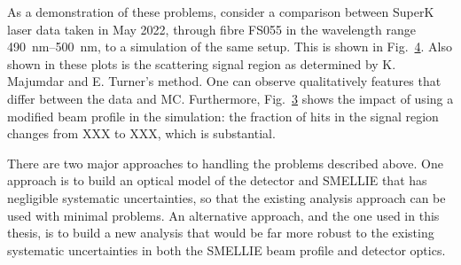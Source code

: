 As a demonstration of these problems, consider a comparison between SuperK laser data taken in May 2022, through fibre FS055 in the wavelength range \SIrange{490}{500}{\nm}, to a simulation of the same setup. This is shown in Fig.~\ref{fig:smellie_tres_alpha_data_mc}. Also shown in these plots is the scattering signal region as determined by K. Majumdar and E. Turner's method. One can observe qualitatively features that differ between the data and MC. %
Furthermore, Fig.~\ref{fig:smellie_tresalpha_mc2} shows the impact of using a modified beam profile in the simulation: the fraction of hits in the signal region changes from XXX to XXX, which is substantial.

\begin{figure}
    \centering
    \begin{subfigure}{0.98\textwidth}
        \centering
        \caption{}
        \label{fig:smellie_tresalpha_data}
    \end{subfigure}
    \begin{subfigure}{0.98\textwidth}
        \centering
        \caption{}
        \label{fig:smellie_tresalpha_mc}
    \end{subfigure}
    \begin{subfigure}{0.98\textwidth}
        \centering
        \caption{}
        \label{fig:smellie_tresalpha_mc2}
    \end{subfigure}
    \caption[]{}
    \label{fig:smellie_tres_alpha_data_mc}
\end{figure}

There are two major approaches to handling the problems described above. One approach is to build an optical model of the detector and SMELLIE that has negligible systematic uncertainties, so that the existing analysis approach can be used with minimal problems. An alternative approach, and the one used in this thesis, is to build a new analysis that would be far more robust to the existing systematic uncertainties in both the SMELLIE beam profile and detector optics.


